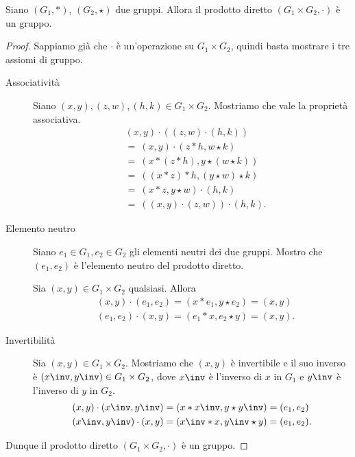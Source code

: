 \begin{proposition}
    Siano $(G_1, *)$, $(G_2, \star)$ due gruppi. Allora il prodotto diretto $(G_1 \times G_2, \cdot)$ è un gruppo. 
\end{proposition}
\begin{proof}
    Sappiamo già che $\cdot$ è un'operazione su $G_1 \times G_2$, quindi basta mostrare i tre assiomi di gruppo.
    \begin{description}
        \item[Associatività] Siano $(x, y), (z, w), (h, k) \in G_1 \times G_2$. Mostriamo che vale la proprietà associativa.
        \begin{align*}
            &(x, y) \cdot ((z, w) \cdot (h, k)) \tag{def. di $\cdot$}\\
            &=\ (x, y) \cdot (z \ast h, w \star k)\tag{def. di $\cdot$}\\
            &=\ (x \ast (z \ast h), y \star (w \star k))\tag{ass. di $*$ e $\star$}\\
            &=\ ((x \ast z) \ast h, (y \star w) \star k) \\
            &=\ (x \ast z, y \star w) \cdot (h, k) \\
            &=\ ((x, y) \cdot (z, w)) \cdot (h, k).
        \end{align*}  
        \item[Elemento neutro] Siano $e_1 \in G_1, e_2 \in G_2$ gli elementi neutri dei due gruppi. Mostro che $(e_1, e_2)$ è l'elemento neutro del prodotto diretto.
        
        Sia $(x, y) \in G_1 \times G_2$ qualsiasi. Allora \begin{align*}
            &(x, y) \cdot (e_1, e_2) = (x * e_1, y \star e_2) = (x, y)\\
            &(e_1, e_2)\cdot (x, y)  = (e_1 * x, e_2 \star y) = (x, y).
        \end{align*}
        \item[Invertibilità] Sia $(x, y) \in G_1 \times G_2$. Mostriamo che $(x, y)$ è invertibile e il suo inverso è $(x\inv, y\inv) \in G_1 \times G_2$, dove $x\inv$ è l'inverso di $x$ in $G_1$ e $y\inv$ è l'inverso di $y$ in $G_2$.
        \begin{align*}
            &(x, y) \cdot (x\inv, y\inv) = (x \ast x\inv, y \star y\inv) = (e_1, e_2)\\
            &(x\inv, y\inv)\cdot (x, y)  = (x\inv \ast x, y\inv \star y) = (e_1, e_2).
        \end{align*} 
    \end{description}
    Dunque il prodotto diretto $(G_1 \times G_2, \cdot)$ è un gruppo.
\end{proof}

